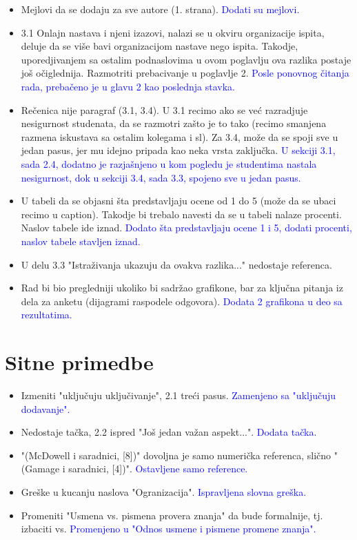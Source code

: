 \documentclass[a4paper]{report}
\newcommand{\odgovor}[1]{\textcolor{blue}{#1}}
\begin{document}
\begin{itemize}
    \item Mejlovi da se dodaju za sve autore (1. strana).
    \odgovor{Dodati su mejlovi.}
    \item 3.1 Onlajn nastava i njeni izazovi, nalazi se u okviru organizacije ispita, deluje da se više bavi organizacijom nastave nego ispita. Takodje, uporedjivanjem sa ostalim podnaslovima u ovom poglavlju ova razlika postaje još očiglednija. Razmotriti prebacivanje u poglavlje 2.
    \odgovor{Posle ponovnog čitanja rada, prebačeno je u glavu 2 kao poslednja stavka.}
    \item Rečenica nije paragraf (3.1, 3.4). U 3.1 recimo ako se već razradjuje nesigurnost studenata, da se razmotri zašto je to tako (recimo smanjena razmena iskustava sa ostalim kolegama i sl). Za 3.4, može da se spoji sve u jedan pasus, jer mu idejno pripada kao neka vrsta zaključka.
    \odgovor{U sekciji 3.1, sada 2.4, dodatno je razjašnjeno u kom pogledu je studentima nastala nesigurnost, dok u sekciji 3.4, sada 3.3, spojeno sve u jedan pasus.}
    \item U tabeli da se objasni šta predstavljaju ocene od 1 do 5 (može da se ubaci recimo u caption). Takodje bi trebalo navesti da se u tabeli nalaze procenti. Naslov tabele ide iznad.
    \odgovor{Dodato šta predstavljaju ocene 1 i 5, dodati procenti, naslov tabele stavljen iznad.}
    \item U delu 3.3 "Istraživanja ukazuju da ovakva razlika..."\hspace{0.1cm} nedostaje referenca.
    \item Rad bi bio pregledniji ukoliko bi sadržao grafikone, bar za ključna pitanja iz dela za anketu (dijagrami raspodele odgovora).
    \odgovor{Dodata 2 grafikona u deo sa rezultatima.}
\end{itemize}

\section{Sitne primedbe}


\begin{itemize}
    \item Izmeniti "uključuju uključivanje", 2.1 treći pasus.
    \odgovor{Zamenjeno sa "uključuju dodavanje".}
    \item Nedostaje tačka, 2.2 ispred "Još
    jedan važan aspekt...".
    \odgovor{Dodata tačka.}
    \item "(McDowell i saradnici, [8])"\hspace{0.1cm} dovoljna je samo numerička referenca, slično  "(Gamage i saradnici, [4])".
    \odgovor{Ostavljene samo reference.}
    \item Greške u kucanju naslova "Ogranizacija".
    \odgovor{Ispravljena slovna greška.}
    \item Promeniti "Usmena vs. pismena provera znanja"\hspace{0.1cm} da bude formalnije, tj. izbaciti vs.
    \odgovor{Promenjeno u "Odnos usmene i pismene promene znanja".}
\end{itemize}
\end{document}
